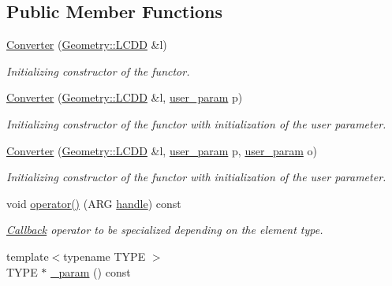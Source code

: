 \subsection*{Public Member Functions}
\begin{DoxyCompactItemize}
\item 
\hyperlink{struct_d_d4hep_1_1_converter_ab693f490d06d475fb15dc360ed45015f}{Converter} (\hyperlink{class_d_d4hep_1_1_geometry_1_1_l_c_d_d}{Geometry\+::\+L\+C\+DD} \&l)
\begin{DoxyCompactList}\small\item\em Initializing constructor of the functor. \end{DoxyCompactList}\item 
\hyperlink{struct_d_d4hep_1_1_converter_a46856eb07ef211b0e78d2ce8b336a213}{Converter} (\hyperlink{class_d_d4hep_1_1_geometry_1_1_l_c_d_d}{Geometry\+::\+L\+C\+DD} \&l, \hyperlink{struct_d_d4hep_1_1_converter_a13a876ea9cfcadf85a3dadd32e97a834}{user\+\_\+param} p)
\begin{DoxyCompactList}\small\item\em Initializing constructor of the functor with initialization of the user parameter. \end{DoxyCompactList}\item 
\hyperlink{struct_d_d4hep_1_1_converter_ac18342c9491be390a9329d2ae05b0bb6}{Converter} (\hyperlink{class_d_d4hep_1_1_geometry_1_1_l_c_d_d}{Geometry\+::\+L\+C\+DD} \&l, \hyperlink{struct_d_d4hep_1_1_converter_a13a876ea9cfcadf85a3dadd32e97a834}{user\+\_\+param} p, \hyperlink{struct_d_d4hep_1_1_converter_a13a876ea9cfcadf85a3dadd32e97a834}{user\+\_\+param} o)
\begin{DoxyCompactList}\small\item\em Initializing constructor of the functor with initialization of the user parameter. \end{DoxyCompactList}\item 
void \hyperlink{struct_d_d4hep_1_1_converter_a1f9f2d565fedc2a7d2819788d64fc54e}{operator()} (A\+RG \hyperlink{_geant4_converter_8cpp_a3789cd8800e1433fb917a1d6f85ef67d}{handle}) const
\begin{DoxyCompactList}\small\item\em \hyperlink{class_d_d4hep_1_1_callback}{Callback} operator to be specialized depending on the element type. \end{DoxyCompactList}\item 
{\footnotesize template$<$typename T\+Y\+PE $>$ }\\T\+Y\+PE $\ast$ \hyperlink{struct_d_d4hep_1_1_converter_ad0b878727e33581fc9dbe6c031a40d92}{\+\_\+param} () const

\end{DoxyCompactItemize}
